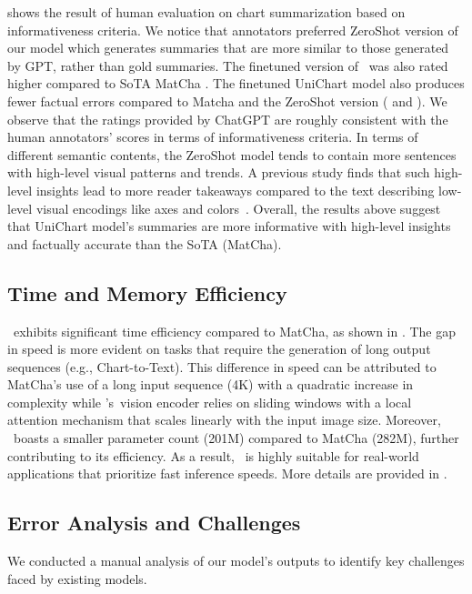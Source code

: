  shows the result of human evaluation on chart summarization based on informativeness criteria. We notice that annotators preferred ZeroShot version of our model which generates summaries that are more similar to those generated by GPT, rather than gold summaries. The finetuned version of \model\ was also rated higher
compared to SoTA MatCha \cite{liu2022matcha}. The finetuned UniChart model also produces fewer factual errors compared to Matcha and the ZeroShot version ( and ). We observe that the ratings provided by ChatGPT are roughly consistent with the human annotators' scores in terms of informativeness criteria. In terms of different semantic contents, the ZeroShot model tends to contain more sentences with high-level visual patterns and trends.
A previous study finds that such high-level insights lead to more reader takeaways compared to the text describing low-level visual encodings like axes and colors~\cite{stokes2022striking}. Overall, the results above suggest that UniChart model's summaries are more informative with high-level insights and factually accurate than the SoTA (MatCha).

\vspace{-1mm}
\subsection{Time and Memory Efficiency} 
\model\ exhibits significant time efficiency compared to MatCha, as shown in . The gap in speed is more evident on tasks that require the generation of long output sequences (e.g., Chart-to-Text). This difference in speed can be attributed to MatCha's use of a long input sequence (4K) with a quadratic increase in complexity while \model's\ vision encoder relies on sliding windows with a local attention mechanism that scales linearly with the input image size. Moreover, \model\ boasts a smaller parameter count (201M) compared to MatCha (282M), further contributing to its efficiency. As a result, \model\ is highly suitable for real-world applications that prioritize fast inference speeds. More details are provided in . 

\vspace{-1mm}
\subsection{Error Analysis and Challenges}
We conducted a manual analysis of our model's outputs to identify key challenges faced by existing models.


